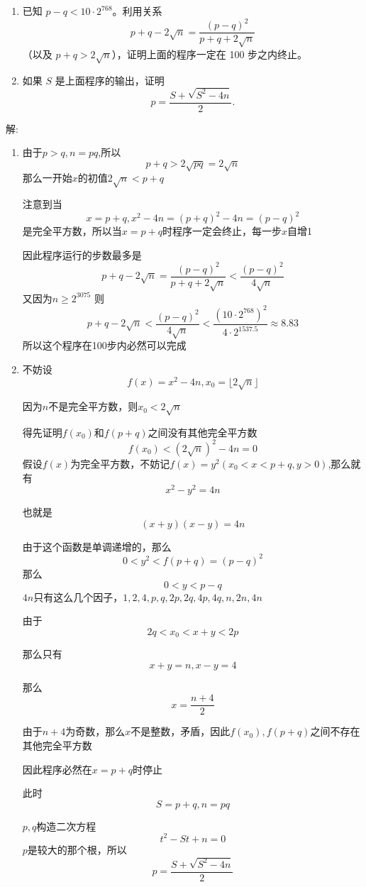 \documentclass[12pt,a4paper]{article}
\begin{document}
\begin{enumerate}
\item 已知 $p - q < 10 \cdot 2^{768}$。利用关系
\[
p + q - 2\sqrt{n} = \frac{(p - q)^2}{p + q + 2\sqrt{n}}
\]
（以及 $p + q > 2\sqrt{n}$），证明上面的程序一定在 100 步之内终止。

\item 如果 $S$ 是上面程序的输出，证明
\[
p = \frac{S + \sqrt{S^2 - 4n}}{2}.
\]
\end{enumerate}
解: 
\begin{enumerate}
\item
由于\(p>q,n=pq\),所以
\[
p+q > 2\sqrt{pq} = 2\sqrt{n}
\]
那么一开始\(x\)的初值\(2\sqrt{n}<p+q\)

注意到当\[
x = p+q,x^2-4n = (p+q)^2 - 4n = (p-q)^2
\]
是完全平方数，所以当\(x=p+q\)时程序一定会终止，每一步\(x\)自增1

因此程序运行的步数最多是
\[
p+q - 2\sqrt{n} = \frac{(p-q)^2}{p+q+2\sqrt{n}} < \frac{(p-q)^2}{4\sqrt{n}}
\]
又因为\(n \geq 2^{3075}\)
则
\[
p+q - 2\sqrt{n} < \frac{(p-q)^2}{4\sqrt{n}} < \frac{(10 \cdot 2^{768})^2}{4\cdot 2^{1537.5}} \approx 8.83
\]
所以这个程序在100步内必然可以完成
\item 
不妨设\[
f(x) = x^2 - 4n,x_0 = \lfloor 2\sqrt{n} \rfloor
\]

因为\(n\)不是完全平方数，则\(x_0 < 2\sqrt{n}\)

得先证明\(f(x_0)\)和\(f(p+q)\)之间没有其他完全平方数
\[
f(x_0) < (2\sqrt{n})^2 - 4n = 0 
\]
假设\(f(x)\)为完全平方数，不妨记\(f(x)=y^2(x_0<x<p+q,y>0)\),那么就有
\[
x^2-y^2 = 4n
\]

也就是
\[
(x+y)(x-y) = 4n
\]

由于这个函数是单调递增的，那么
\[
0 < y^2 < f(p+q) = (p-q)^2
\]
那么
\[
0 < y < p-q
\]
\(4n\)只有这么几个因子，\(1,2,4,p,q,2p,2q,4p,4q,n,2n,4n\)

由于\[
2q < x_0 < x+y < 2p
\]

那么只有\[
x+y = n,x-y = 4
\]

那么\[
x = \frac{n+4}{2}
\]

由于\(n+4\)为奇数，那么\(x\)不是整数，矛盾，因此\(f(x_0),f(p+q)\)之间不存在其他完全平方数

因此程序必然在\(x=p+q\)时停止

此时\[
S = p+q,n = pq
\]

\(p,q\)构造二次方程
\[
t^2-St + n = 0
\]
\(p\)是较大的那个根，所以\[
p = \frac{S+\sqrt{S^2-4n}}{2}
\]

\end{enumerate}
\end{document}

